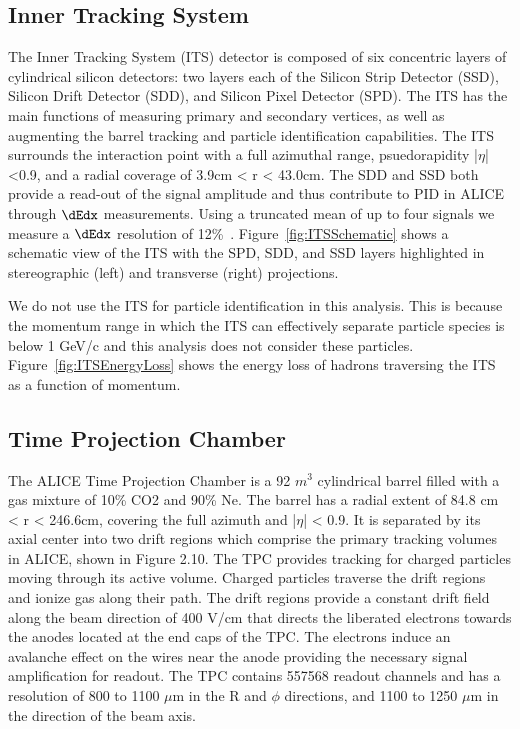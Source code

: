 \subsection*{Inner Tracking System}

The Inner Tracking System (ITS) detector is composed of six concentric layers of cylindrical silicon detectors: two layers each of the Silicon Strip Detector (SSD), Silicon Drift Detector (SDD), and Silicon Pixel Detector (SPD). The ITS has the main functions of measuring primary and secondary vertices, as well as augmenting the barrel tracking and particle identification capabilities. The ITS surrounds the interaction point with a full azimuthal range, psuedorapidity |$\eta$| <0.9, and a radial coverage of 3.9cm < r < 43.0cm. The SDD and SSD both provide a read-out of the signal amplitude and thus contribute to PID in ALICE through $\dEdx$ measurements. Using a truncated mean of up to four signals we measure a $\dEdx$ resolution of 12\%~\cite{}. Figure~\ref{fig:ITSSchematic} shows a schematic view of the ITS with the SPD, SDD, and SSD layers highlighted in stereographic (left) and transverse (right) projections.

We do not use the ITS for particle identification in this analysis. This is because the momentum range in which the ITS can effectively separate particle species is below 1 GeV/c and this analysis does not consider these particles. Figure~\ref{fig:ITSEnergyLoss} shows the energy loss of hadrons traversing the ITS as a function of momentum.

\subsection*{Time Projection Chamber}\label{subsec:TPC}

The ALICE Time Projection Chamber is a 92 $m^3$ cylindrical barrel filled with a gas mixture of 10\% CO2 and 90\% Ne. The barrel has a radial extent of 84.8 cm < r < 246.6cm, covering the full azimuth and |$\eta$| < 0.9. It is separated by its axial center into two drift regions which comprise the primary tracking volumes in ALICE, shown in Figure 2.10. The TPC provides tracking for charged particles moving through its active volume. Charged particles traverse the drift regions and ionize gas along their path. The drift regions provide a constant drift field along the beam direction of 400 V/cm that directs the liberated electrons towards the anodes located at the end caps of the TPC. The electrons induce an avalanche effect on the wires near the anode providing the necessary signal amplification for readout. The TPC contains 557568 readout channels and has a resolution of 800 to 1100 $\mu$m in the R and $\phi$ directions, and 1100 to 1250 $\mu$m in the direction of the beam axis. 

